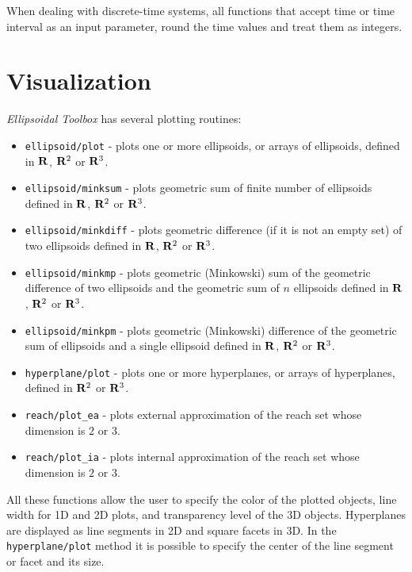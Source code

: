 \documentclass{report}
\begin{document}
When dealing with discrete-time systems, all functions that accept time or
time interval as an input parameter, round the time values and treat them as
integers.



\section{Visualization}
{\it Ellipsoidal Toolbox} has several plotting routines:
\begin{itemize}
\item {\tt ellipsoid/plot} - plots one or more ellipsoids, or arrays of
ellipsoids, defined in ${\bf R}$, ${\bf R}^2$ or ${\bf R}^3$.
\item {\tt ellipsoid/minksum} - plots geometric sum of finite number of
ellipsoids defined in ${\bf R}$, ${\bf R}^2$ or ${\bf R}^3$.
\item {\tt ellipsoid/minkdiff} - plots geometric difference
(if it is not an empty set) of two ellipsoids defined in
${\bf R}$, ${\bf R}^2$ or ${\bf R}^3$.
\item {\tt ellipsoid/minkmp} - plots geometric (Minkowski) sum
of the geometric difference of two ellipsoids and the geometric sum of $n$
ellipsoids defined in ${\bf R}$, ${\bf R}^2$ or ${\bf R}^3$.
\item {\tt ellipsoid/minkpm} - plots geometric (Minkowski) difference of the
geometric sum of ellipsoids and a single ellipsoid defined in
${\bf R}$, ${\bf R}^2$ or ${\bf R}^3$.
\item {\tt hyperplane/plot} - plots one or more hyperplanes, or arrays of
hyperplanes, defined in ${\bf R}^2$ or ${\bf R}^3$.
\item {\tt reach/plot\_ea} - plots external approximation of the reach set
whose dimension is $2$ or $3$.
\item {\tt reach/plot\_ia} - plots internal approximation of the reach set
whose dimension is $2$ or $3$.
\end{itemize}
All these functions allow the user to specify the color of the plotted objects,
line width for 1D and 2D plots, and transparency level of the 3D objects.
Hyperplanes are displayed as line segments in 2D and square facets in 3D.
In the {\tt hyperplane/plot} method it is possible to specify the center
of the line segment or facet and its size.
\end{document}
